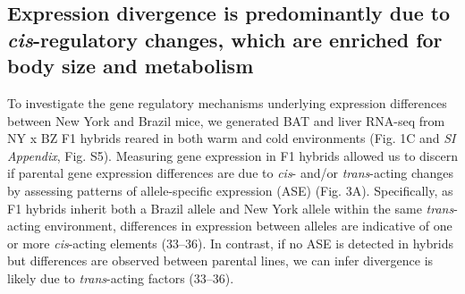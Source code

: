 \documentclass[9pt,twocolumn,twoside,lineno]{pnas-new}
\begin{document}
\hypertarget{expression-divergence-is-predominantly-due-to-cis-regulatory-changes-which-are-enriched-for-body-size-and-metabolism}{%
\subsection*{\texorpdfstring{Expression divergence is predominantly due
to \emph{cis}-regulatory changes, which are enriched for body size and
metabolism}{Expression divergence is predominantly due to cis-regulatory changes, which are enriched for body size and metabolism}}\label{expression-divergence-is-predominantly-due-to-cis-regulatory-changes-which-are-enriched-for-body-size-and-metabolism}}

To investigate the gene regulatory mechanisms underlying expression
differences between New York and Brazil mice, we generated BAT and liver
RNA-seq from NY x BZ F1 hybrids reared in both warm and cold
environments (Fig. 1C and \emph{SI Appendix}, Fig. S5). Measuring gene
expression in F1 hybrids allowed us to discern if parental gene
expression differences are due to \emph{cis}- and/or \emph{trans}-acting
changes by assessing patterns of allele-specific expression (ASE) (Fig.
3A). Specifically, as F1 hybrids inherit both a Brazil allele and New
York allele within the same \emph{trans}-acting environment, differences
in expression between alleles are indicative of one or more
\emph{cis}-acting elements (33--36). In contrast, if no ASE is detected
in hybrids but differences are observed between parental lines, we can
infer divergence is likely due to \emph{trans}-acting factors (33--36).
\end{document}
